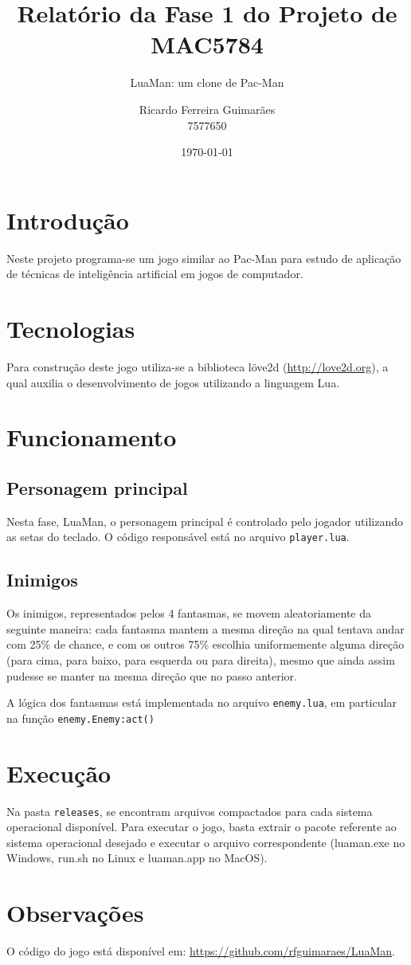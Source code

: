 \documentclass[a4paper]{scrartcl}
\title{Relatório da Fase 1 do Projeto de MAC5784}
\subtitle{LuaMan: um clone de Pac-Man}
\author{Ricardo Ferreira Guimarães \\ 7577650}
\date{\today}
\begin{document}
\maketitle

\section{Introdução}

Neste projeto programa-se um jogo similar ao Pac-Man para estudo de aplicação de
técnicas de inteligência artificial em jogos de computador.

\section{Tecnologias}

Para construção deste jogo utiliza-se a biblioteca löve2d (\url{http://love2d.org}),
a qual auxilia o desenvolvimento de jogos utilizando a linguagem Lua.

\section{Funcionamento}

\subsection{Personagem principal}

Nesta fase, LuaMan, o personagem principal é controlado pelo jogador utilizando as setas do teclado.
O código responsável está no arquivo \texttt{player.lua}.

\subsection{Inimigos}

Os inimigos, representados pelos 4 fantasmas, se movem aleatoriamente da seguinte maneira:
cada fantasma mantem a mesma direção na qual tentava andar com 25\% de chance, e com os outros 75\%
escolhia uniformemente alguma direção (para cima, para baixo, para esquerda ou para direita), mesmo
que ainda assim pudesse se manter na mesma direção que no passo anterior.

A lógica dos fantasmas está implementada no arquivo \texttt{enemy.lua}, em particular na função
\texttt{enemy.Enemy:act()}

\section{Execução}

Na pasta \texttt{releases}, se encontram arquivos compactados para cada sistema operacional disponível.
Para executar o jogo, basta extrair o pacote referente ao sistema operacional desejado e executar o
arquivo correspondente (luaman.exe no Windows, run.sh no Linux e luaman.app no MacOS).

\section{Observações}

O código do jogo está disponível em: \url{https://github.com/rfguimaraes/LuaMan}.
\end{document}
